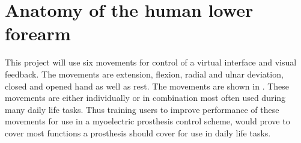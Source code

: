 \section{Anatomy of the human lower forearm} \label{sec:anatomy}


This project will use six movements for control of a virtual interface and visual feedback. The movements are extension, flexion, radial and ulnar deviation, closed and opened hand as well as rest. The movements are shown in . %
These movements are either individually or in combination most often used during many daily life tasks. Thus training users to improve performance of these movements for use in a myoelectric prosthesis control scheme, would prove to cover most functions a prosthesis should cover for use in daily life tasks. 



